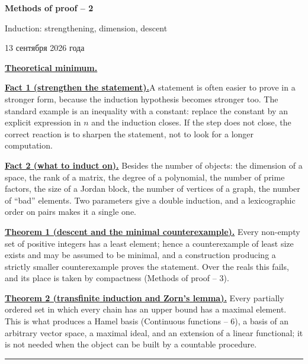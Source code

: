 \documentclass[11pt,a4paper]{article}
\newcommand{\head}[1]{\par\vspace{15pt}\noindent\textbf{\underline{#1}}\quad\ignorespaces}
\begin{document}
\begin{center}
{\huge\bfseries Methods of proof -- 2\par}\vspace{1.1em}
{\Large Induction: strengthening, dimension, descent\par}\vspace{1.1em}
{\foreignlanguage{russian}{13 сентября 2026 года}\par}
\end{center}\vspace{3.2pt}

\noindent\textbf{\underline{Theoretical minimum.}}\par\vspace{10pt}
\noindent\textbf{\underline{Fact 1 (strengthen the statement).}}\quad A statement is often easier to prove in a stronger
form, because the induction hypothesis becomes stronger too. The standard example is an
inequality with a constant: replace the constant by an explicit expression in $n$ and the
induction closes. If the step does not close, the correct reaction is to sharpen the statement,
not to look for a longer computation.

\head{Fact 2 (what to induct on).} Besides the number of objects: the dimension of a space, the
rank of a matrix, the degree of a polynomial, the number of prime factors, the size of a Jordan
block, the number of vertices of a graph, the number of ``bad'' elements. Two parameters give a
double induction, and a lexicographic order on pairs makes it a single one.

\head{Theorem 1 (descent and the minimal counterexample).} Every non-empty set of positive
integers has a least element; hence a counterexample of least size exists and may be assumed to
be minimal, and a construction producing a strictly smaller counterexample proves the statement.
Over the reals this fails, and its place is taken by compactness (Methods of proof -- 3).

\head{Theorem 2 (transfinite induction and Zorn's lemma).} Every partially ordered set in which
every chain has an upper bound has a maximal element. This is what produces a Hamel basis
(Continuous functions -- 6), a basis of an arbitrary vector space, a maximal ideal, and an
extension of a linear functional; it is not needed when the object can be built by a countable
procedure.

\medskip
\noindent\rule{\textwidth}{0.4pt}
\medskip
\end{document}
